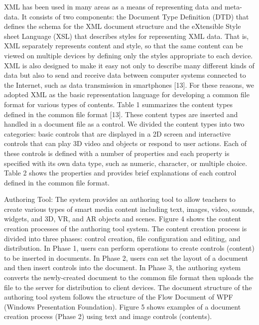 \documentclass[journal]{vgtc}                %
\begin{document}
  XML has been used in many areas as a means of representing data and meta-data. It consists of two components: the Document Type Definition (DTD) that defines the schema for the XML document structure and the eXtensible Style sheet Language (XSL) that describes styles for representing XML data. That is, XML separately represents content and style, so that the same content can be viewed on multiple devices by defining only the styles appropriate to each device. XML is also designed to make it easy not only to describe many different kinds of data but also to send and receive data between computer systems connected to the Internet, such as data transmission in smartphones [13]. For these reasons, we adopted XML as the basic representation language for developing a common file format for various types of contents. Table 1 summarizes the content types defined in the common file format [13]. These content types are inserted and handled in a document file as a control. We divided the content types into two categories: basic controls that are displayed in a 2D screen and interactive controls that can play 3D video and objects or respond to user actions. Each of these controls is defined with a number of properties and each property is specified with its own data type, such as numeric, character, or multiple choice. Table 2 shows the properties and provides brief explanations of each control defined in the common file format.

  Authoring Tool: The system provides an authoring tool to allow teachers to create various types of smart media content including text, images, video, sounds, widgets, and 3D, VR, and AR objects and scenes. Figure 4 shows the content creation processes of the authoring tool system. The content creation process is divided into three phases: control creation, file configuration and editing, and distribution. In Phase 1, users can perform operations to create controls (content) to be inserted in documents. In Phase 2, users can set the layout of a document and then insert controls into the document. In Phase 3, the authoring system converts the newly-created document to the common file format then uploads the file to the server for distribution to client devices. The document structure of the authoring tool system follows the structure of the Flow Document of WPF (Windows Presentation Foundation). Figure 5 shows examples of a document creation process (Phase 2) using text and image controls (contents).
\end{document}
